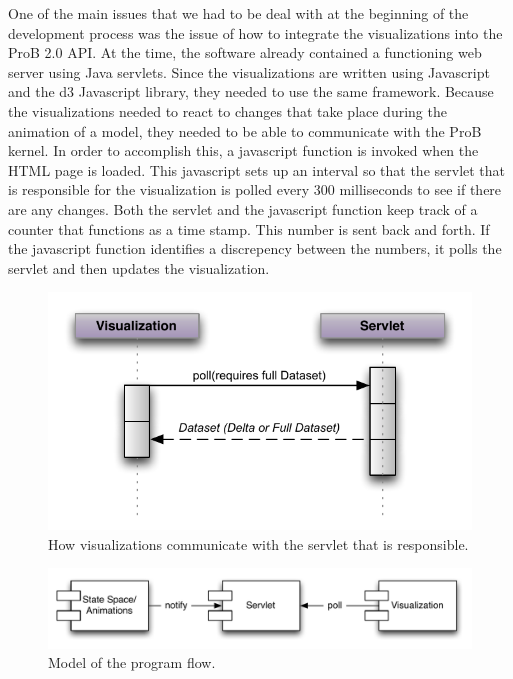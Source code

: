 One of the main issues that we had to be deal with at the beginning of the development process was the issue of how to integrate the visualizations into the ProB 2.0 API. At the time, the software already contained a functioning web server using Java servlets. Since the visualizations are written using Javascript and the d3 Javascript library, they needed to use the same framework. Because the visualizations needed to react to changes that take place during the animation of a model, they needed to be able to communicate with the ProB kernel. In order to accomplish this, a javascript function is invoked when the HTML page is loaded. This javascript sets up an interval so that the servlet that is responsible for the visualization is polled every 300 milliseconds to see if there are any changes. Both the servlet and the javascript function keep track of a counter that functions as a time stamp. This number is sent back and forth. If the javascript function identifies a discrepency between the numbers, it polls the servlet and then updates the visualization.

\begin{figure}[h!]
\centering
\includegraphics[width=15cm]{bilder/communication.pdf}
\caption{How visualizations communicate with the servlet that is responsible.}
\label{communication}
\end{figure}

\begin{figure}[h!]
\centering
\includegraphics[width=15cm]{bilder/programFlow.pdf}
\caption{Model of the program flow.}
\label{programFlow}
\end{figure}

